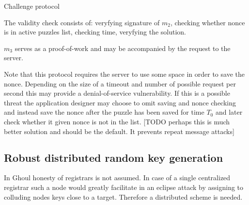 \begin{msc}{Challenge protocol}
\setlength{\instdist}{9cm}
\setlength{\envinstdist}{3cm}
\nextlevel
{}
\nextlevel[9]
\nextlevel[1]
\nextlevel[4]
\nextlevel
{}
\nextlevel[4]
\end{msc}

The validity check consists of: veryfying signature of $m_2$, checking whether
nonce is in active puzzles list, checking time, veryfying the solution.

$m_3$ serves as a proof-of-work and may be accompanied by the request to the
server.

Note that this protocol requires the server to use some space in order to save
the nonce. Depending on the size of a timeout and number of possible request per
second this may provide a denial-of-service vulnerability. If this is a possible
threat the application designer may choose to omit saving and nonce checking and
instead save the nonce after the puzzle has been saved for time $T_0$ and later
check whether it given nonce is not in the list. [TODO perhaps this is much
better solution and should be the default. It prevents repeat message attacks]

\subsection{Robust distributed random key generation}

In Ghoul honesty of registrars is not assumed. In case of a single centralized
registrar such a node would greatly facilitate in an eclipse attack by
assigning to colluding nodes keys close to a target. Therefore a distributed
scheme is needed.

